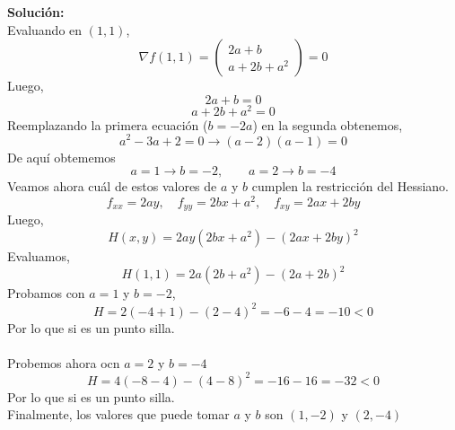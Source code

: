 \documentclass[12pt]{article}
\newenvironment{solucion}
{\begin{mdframed}[backgroundcolor=black!10]
		{\bf Solución:}\\
	}
	{
	\end{mdframed}
}
\newenvironment{preguntas}
{\begin{enumerate}\itemsep12pt
	}
	{
	\end{enumerate}
}
\newcommand{\ra}{\rightarrow}
\begin{document}
\begin{preguntas}
\begin{solucion}
Evaluando en $(1,1)$,
$$\nabla f(1,1) = \begin{pmatrix} 2a + b \\ a + 2b + a^2\end{pmatrix} = 0$$
Luego,
$$2a + b = 0$$
$$a + 2b + a^2= 0$$
Reemplazando la primera ecuación ($b = -2a$) en la segunda obtenemos,
$$a^2 - 3a +2 = 0 \ra (a-2)(a-1) = 0$$
De aquí obtememos
$$a = 1 \ra b = -2, \qquad a = 2 \ra b = -4$$
Veamos ahora cuál de estos valores de $a$ y $b$ cumplen la restricción del Hessiano.
$$f_{xx} = 2ay, \quad f_{yy} = 2bx + a^2, \quad f_{xy} = 2ax + 2by$$
Luego,
$$H(x,y) = 2ay(2bx+a^2) - (2ax +2by)^2$$
Evaluamos,
$$H(1,1) = 2a(2b+a^2) - (2a+2b)^2$$
Probamos con $a=1$ y $b=-2$,
$$H = 2(-4+1)-(2-4)^2 = -6 - 4 = -10 < 0$$
Por lo que si es un punto silla.\\
\\
Probemos ahora ocn $a = 2$ y $b = -4$
$$H = 4(-8-4)-(4-8)^2 = -16 - 16 = -32 < 0$$
Por lo que si es un punto silla.\\

Finalmente, los valores que puede tomar $a$ y $b$ son $(1, -2)$ y $(2, -4)$
\end{solucion}
\end{preguntas}
\end{document}
